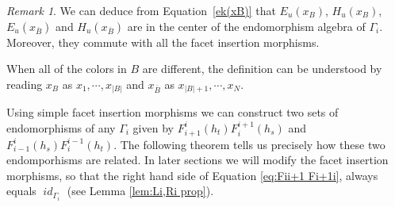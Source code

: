 \documentclass[12pt]{amsart}
\theoremstyle{definition}
\theoremstyle{remark}
\newtheorem{remark}[theorem]{Remark}
\numberwithin{equation}{section}
\numberwithin{figure}{section}
\DeclareMathOperator{\idfoam}{\mathit{id}}
\begin{document}
\begin{remark}
    We can deduce from Equation~\ref{ek(xB)} that $E_u(x_B)$, $H_u(x_B)$, $E_u(x_{\overline{B}})$ and $H_u(x_{\overline{B}})$ are in the center of the endomorphism algebra of $\Gamma_{i}$. Moreover, they commute with all the facet insertion morphisms.
    
    When all of the colors in $B$ are different, the definition can be understood by reading $x_B$ as $x_1,\cdots,x_{|B|}$ and $x_{\overline{B}}$ as $x_{|B|+1},\cdots,x_N$. 
\end{remark}

Using simple facet insertion morphisms we can construct two sets of endomorphisms of any $\Gamma_i$ given by $F_{i+1}^i(h_t)F_i^{i+1}(h_s)$ and $F_{i-1}^i(h_s)F_i^{i-1}(h_t)$. The following theorem tells us precisely how these two endomporhisms are related. In later sections we will modify the facet insertion morphisms, so that the right hand side of Equation \eqref{eq:Fii+1 Fi+1i}, always equals $\idfoam_{\Gamma_i}$ (see Lemma \ref{lem:Li,Ri prop}).
\end{document}
